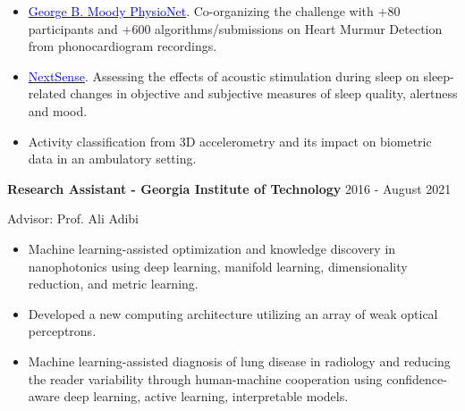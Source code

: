 \documentclass[margin, line]{res}
\newenvironment{list1}{
  \begin{list}{\ding{113}}{%
      \setlength{\itemsep}{0in}
      \setlength{\parsep}{0in} \setlength{\parskip}{0in}
      \setlength{\topsep}{0in} \setlength{\partopsep}{0in} 
      \setlength{\leftmargin}{0.17in}}}{\end{list}}
\begin{document}
\begin{resume}
\begin{list1}
\begin{itemize}
\begin{itemize}
\begin{itemize}
    \end{itemize}
              \end{itemize}
		  \item  \href{https://moody-challenge.physionet.org/2022/}{{\textcolor{blue}{George B. Moody PhysioNet}}}. Co-organizing the challenge with +80 participants and +600 algorithms/submissions on Heart Murmur Detection from phonocardiogram recordings.
    \item \href{https://www.nextsense.io}{{\textcolor{blue}{NextSense}}}. Assessing the effects of acoustic stimulation during sleep on sleep-related changes in objective and subjective measures of sleep quality, alertness and mood.
    \item Activity classification from 3D accelerometry and its impact on biometric data in an ambulatory setting.
    \end{itemize}

\item[] \textbf{Research Assistant - Georgia Institute of Technology}\hspace*{\fill} 2016 - August 2021
\item[]Advisor: Prof. Ali Adibi
\begin{itemize}
  		\item Machine learning-assisted optimization and knowledge discovery in nanophotonics using deep learning, manifold learning, dimensionality reduction, and metric learning.
        \item Developed a new computing architecture utilizing an array of weak optical perceptrons.
        \item Machine learning-assisted diagnosis of lung disease in radiology and reducing the reader variability through human-machine cooperation using confidence-aware deep learning, active learning, interpretable models.


\end{itemize}
\end{list1}
\end{resume}
\end{document}
